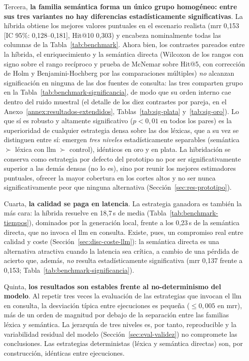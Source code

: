 Tercera, \textbf{la familia semántica forma un único grupo homogéneo: entre sus tres variantes no hay diferencias estadísticamente significativas}.
La híbrida obtiene los mejores valores puntuales en el escenario realista (\gls{mrr} 0,153 [IC 95\%: 0,128--0,181], \mbox{Hit@10} 0,303) y encabeza nominalmente todas las columnas de la Tabla~\ref{tab:benchmark}.
Ahora bien, los contrastes pareados entre la híbrida, el enriquecimiento y la semántica directa (Wilcoxon de los rangos con signo sobre el rango recíproco y prueba de McNemar sobre \mbox{Hit@5}, con corrección de Holm y Benjamini-Hochberg por las comparaciones múltiples) \emph{no} alcanzan significación en ninguna de las dos fuentes de consulta: las tres comparten grupo en la Tabla~\ref{tab:benchmark-significancia}, de modo que su orden interno cae dentro del ruido muestral (el detalle de los diez contrastes por pareja, en el Anexo~\ref{annex:resultados-extendidos}, Tablas~\ref{tab:sig-plata} y~\ref{tab:sig-oro}).
Lo que sí es robusto y altamente significativo ($p<0{,}01$ en todos los pares) es la superioridad de cualquier estrategia densa sobre las dos léxicas, que a su vez se distinguen entre sí: emergen \emph{tres niveles} estadísticamente separables (semántica $\succ$ léxica con \gls{llm} $\succ$ control), idénticos en oro y en plata.
La hibridación se conserva como estrategia por defecto del prototipo no por ser significativamente superior a las demás densas (no lo es), sino por reunir los mejores estimadores puntuales, ofrecer la mayor cobertura en los cortes altos y no ser nunca significativamente peor que ninguna alternativa (Sección~\ref{sec:res-prototipo}).

Cuarta, \textbf{la calidad se paga en latencia}.
La estrategia ganadora es también la más cara: la híbrida resuelve en 18,7\,s de media (Tabla~\ref{tab:benchmark-tiempos}), dominados por la generación local, frente a los 0,23\,s de la semántica directa, que no invoca el \gls{llm} en consulta.
Existe, pues, un compromiso real entre calidad y coste (Sección~\ref{sec:disc-coste-llm}): la semántica directa es una alternativa atractiva cuando la latencia sea crítica, a cambio de una pérdida de acierto que, además, \emph{no} resulta estadísticamente significativa (\gls{mrr} 0,137 frente a 0,153; Tabla~\ref{tab:benchmark-significancia}).

Quinta, \textbf{los resultados son estables frente al no-determinismo del modelo}.
Al repetir tres veces la evaluación de las estrategias que invocan el \gls{llm} en consulta, la desviación típica entre ejecuciones es pequeña ($\le 0{,}005$ en \gls{mrr}), más de un orden de magnitud por debajo de la separación entre las familias léxica y semántica.
La jerarquía de tres niveles es, por tanto, reproducible y la variabilidad residual del modelo (Sección~\ref{sec:eval-validez}) no compromete las conclusiones.
Las estrategias deterministas (léxica y semántica directas) son, por construcción, idénticas entre ejecuciones.

